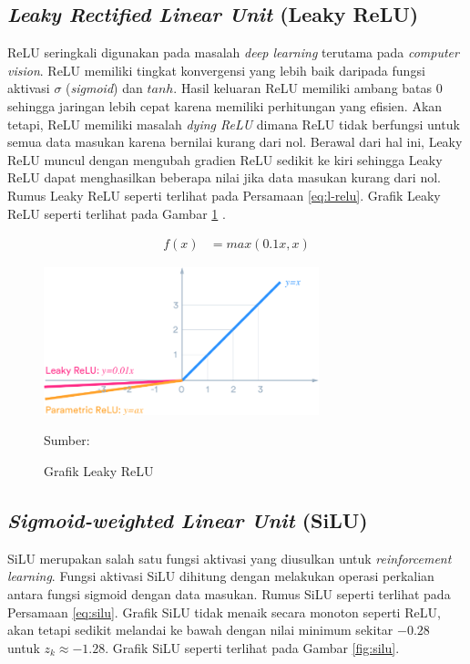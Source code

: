     \subsection{\textit{Leaky Rectified Linear Unit} (Leaky ReLU)}
    ReLU seringkali digunakan pada masalah \textit{deep learning} terutama pada \textit{computer vision}. ReLU memiliki tingkat konvergensi yang lebih baik daripada fungsi aktivasi $\sigma$ (\textit{sigmoid}) dan $tanh$. Hasil keluaran ReLU memiliki ambang batas $0$ sehingga jaringan lebih cepat karena memiliki perhitungan yang efisien. Akan tetapi, ReLU memiliki masalah \textit{dying ReLU} dimana ReLU tidak berfungsi untuk semua data masukan karena bernilai kurang dari nol. Berawal dari hal ini, Leaky ReLU muncul dengan mengubah gradien ReLU sedikit ke kiri sehingga Leaky ReLU dapat menghasilkan beberapa nilai jika data masukan kurang dari nol. Rumus Leaky ReLU seperti terlihat pada Persamaan \ref{eq:l-relu}. Grafik Leaky ReLU seperti terlihat pada Gambar \ref{fig:l-relu} \citep{xu2015empirical}.

    \begin{align}
        \label{eq:l-relu}
        f(x) &= max(0.1x, x)
    \end{align}

    \begin{figure}[H]
        \begin{center}
            \includegraphics[width=8cm]{img/bab2/lrelu.png}
            \caption{Grafik Leaky ReLU}
            \label{fig:l-relu}
            Sumber: \citep{xu2015empirical}
        \end{center}
    \end{figure}

    \subsection{\textit{Sigmoid-weighted Linear Unit} (SiLU)}
    SiLU merupakan salah satu fungsi aktivasi yang diusulkan untuk \textit{reinforcement learning}. Fungsi aktivasi SiLU dihitung dengan melakukan operasi perkalian antara fungsi sigmoid dengan data masukan. Rumus SiLU seperti terlihat pada Persamaan \ref{eq:silu}. Grafik SiLU tidak menaik secara monoton seperti ReLU, akan tetapi sedikit melandai ke bawah dengan nilai minimum sekitar $-0.28$ untuk $z_k \approx -1.28$. Grafik SiLU seperti terlihat pada Gambar \ref{fig:silu}.

